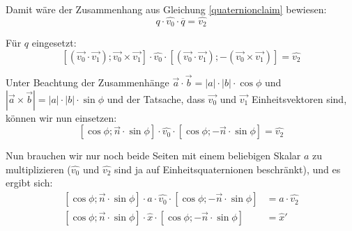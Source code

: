 Damit wäre der Zusammenhang aus Gleichung \ref{quaternionclaim} bewiesen:
\begin{equation*}
 q \cdot \hat{v_0} \cdot \overline{q} = \hat{v_2}
\end{equation*}

Für $q$ eingesetzt:
\begin{equation*}
 \left[ ( \vec{v_0} \cdot \vec{v_1} ); \vec{v_0} \times \vec{v_1} \right] \cdot \hat{v_0} \cdot \left[ ( \vec{v_0} \cdot \vec{v_1} ); -(\vec{v_0} \times \vec{v_1} ) \right] = \hat{v_2}
\end{equation*} 

Unter Beachtung der Zusammenhänge $\vec a \cdot \vec b = \left| a \right| \cdot \left| b \right| \cdot \cos \phi$ und $\left| \vec a \times \vec b \right| = \left| a \right| \cdot \left| b \right| \cdot \sin \phi$ und der Tatsache, dass $\vec{v_0}$ und $\vec{v_1}$ Einheitsvektoren sind, können wir nun einsetzen:
\begin{equation}
 \left[ \cos \phi; \vec n \cdot \sin \phi \right] \cdot \hat{v_0} \cdot \left[ \cos \phi; -\vec n \cdot \sin \phi \right] = \hat{v_2}
\end{equation}

Nun brauchen wir nur noch beide Seiten mit einem beliebigen Skalar $a$ zu multiplizieren ($\hat{v_0}$ und $\hat{v_2}$ sind ja auf Einheitsquaternionen beschränkt), und es ergibt sich:
\begin{equation}
\begin{split}
 \left[ \cos \phi; \vec n \cdot \sin \phi \right] \cdot a \cdot \hat{v_0} \cdot \left[ \cos \phi; -\vec n \cdot \sin \phi \right] &= a \cdot \hat{v_2} \\
 \left[ \cos \phi; \vec n \cdot \sin \phi \right] \cdot \hat{x} \cdot \left[ \cos \phi; -\vec n \cdot \sin \phi \right] &= \hat{x}'
\end{split}
\end{equation}

